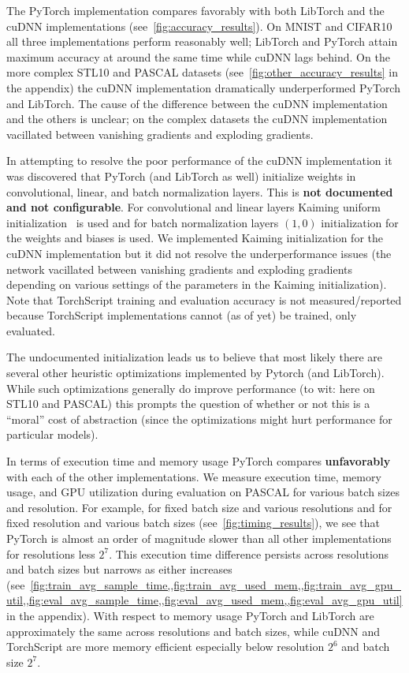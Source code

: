 

The PyTorch implementation compares favorably with both LibTorch and the cuDNN implementations (see~\cref{fig:accuracy_results}).
On MNIST and CIFAR10 all three implementations perform reasonably well;
LibTorch and PyTorch attain maximum accuracy at around the same time while cuDNN lags behind.
On the more complex STL10 and PASCAL datasets (see~\cref{fig:other_accuracy_results} in the appendix) the cuDNN implementation dramatically underperformed PyTorch and LibTorch.
The cause of the difference between the cuDNN implementation and the others is unclear;
on the complex datasets the cuDNN implementation vacillated between vanishing gradients and exploding gradients.

In attempting to resolve the poor performance of the cuDNN implementation it was discovered that PyTorch (and LibTorch as well) initialize weights in convolutional, linear, and batch normalization layers.
This is \textbf{not documented and not configurable}.
For convolutional and linear layers Kaiming uniform initialization~\cite{he2015delving} is used and for batch normalization layers $(1,0)$ initialization for the weights and biases is used.
We implemented Kaiming initialization for the cuDNN implementation but it did not resolve the underperformance issues (the network vacillated between vanishing gradients and exploding gradients depending on various settings of the parameters in the Kaiming initialization).
Note that TorchScript training and evaluation accuracy is not measured/reported because TorchScript implementations cannot (as of yet) be trained, only evaluated.

The undocumented initialization leads us to believe that most likely there are several other heuristic optimizations implemented by Pytorch (and LibTorch).
While such optimizations generally do improve performance (to wit: here on STL10 and PASCAL) this prompts the question of whether or not this is a ``moral'' cost of abstraction (since the optimizations might hurt performance for particular models).



In terms of execution time and memory usage PyTorch compares \textbf{unfavorably} with each of the other implementations.
We measure execution time, memory usage, and GPU utilization during evaluation on PASCAL for various batch sizes and resolution.
For example, for fixed batch size and various resolutions and for fixed resolution and various batch sizes (see~\cref{fig:timing_results}), we see that PyTorch is almost an order of magnitude slower than all other implementations for resolutions less $2^7$.
This execution time difference persists across resolutions and batch sizes but narrows as either increases (see~\cref{fig:train_avg_sample_time,,fig:train_avg_used_mem,,fig:train_avg_gpu_util,,fig:eval_avg_sample_time,,fig:eval_avg_used_mem,,fig:eval_avg_gpu_util} in the appendix).
With respect to memory usage PyTorch and LibTorch are approximately the same across resolutions and batch sizes, while cuDNN and TorchScript are more memory efficient especially below resolution $2^6$ and batch size $2^7$.

